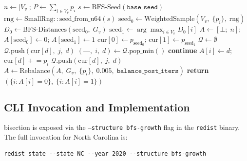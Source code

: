 \begin{algorithm}[t]
\caption{\bfsg{}-\textsc{Bisect}($G_v$, $\mathtt{base\_seed}$, $\mathtt{balance\_post\_iters}$)}
\label{alg:bfs}
\begin{algorithmic}[1]
\State $n \gets |V_v|$; \quad $P \gets \sum_{i \in V_v} p_i$ 
\State $s \gets \mathrm{BFS\text{-}Seed}(\mathtt{base\_seed})$ 
\State $\mathrm{rng} \gets \mathrm{SmallRng::seed\_from\_u64}(s)$
\State $\mathrm{seed}_0 \gets \mathrm{WeightedSample}(V_v,\; \{p_i\},\; \mathrm{rng})$
\State $D_0 \gets \mathrm{BFS\text{-}Distances}(\mathrm{seed}_0,\; G_v)$
\State $\mathrm{seed}_1 \gets \arg\max_{i \in V_v} D_0[i]$
\State $A \gets [\bot;\; n]$; \quad
       $A[\mathrm{seed}_0] \gets 0$; \quad $A[\mathrm{seed}_1] \gets 1$
\State $\mathrm{cur}[0] \gets p_{\mathrm{seed}_0}$; \quad
       $\mathrm{cur}[1] \gets p_{\mathrm{seed}_1}$
\State $\mathcal{Q} \gets \emptyset$ 
      \State $\mathcal{Q}.\mathrm{push}(\mathrm{cur}[d],\; j,\; d)$
    \EndIf
  \EndFor
\EndFor
{}
  \State $(\text{---},\; i,\; d) \gets \mathcal{Q}.\mathrm{pop\_min}()$
   \textbf{continue} \EndIf {}
  \State $A[i] \gets d$; \quad $\mathrm{cur}[d] \mathrel{+}= p_i$
      \State $\mathcal{Q}.\mathrm{push}(\mathrm{cur}[d],\; j,\; d)$
    \EndIf
  \EndFor
\EndWhile
\State $A \gets \mathrm{Rebalance}(A,\; G_v,\; \{p_i\},\; 0.005,\; \mathtt{balance\_post\_iters})$
\State \textbf{return} $(\{i : A[i] = 0\},\; \{i : A[i] = 1\})$
\end{algorithmic}
\end{algorithm}

\subsection{CLI Invocation and Implementation}

\bfsg{} bisection is exposed via the \texttt{--structure bfs-growth}
flag in the \texttt{redist} binary.
The full invocation for North Carolina is:

\begin{verbatim}
redist state --state NC --year 2020 --structure bfs-growth
\end{verbatim}

